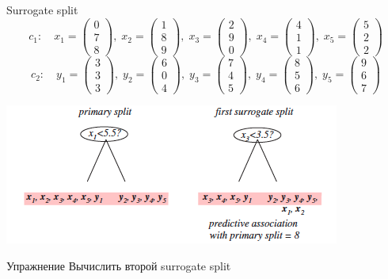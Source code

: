 \documentclass[aspectratio=169]{beamer}
\begin{document}
\begin{frame}{Surrogate split}
\vspace{-1em}
\[
c_1: \quad 
x_1=\begin{pmatrix}0 \\ 7 \\ 8\end{pmatrix},\;
x_2=\begin{pmatrix}1 \\ 8 \\ 9\end{pmatrix},\;
x_3=\begin{pmatrix}2 \\ 9 \\ 0\end{pmatrix},\;
x_4=\begin{pmatrix}4 \\ 1 \\ 1\end{pmatrix},\;
x_5=\begin{pmatrix}5 \\ 2 \\ 2\end{pmatrix}
\]
\[
c_2: \quad 
y_1=\begin{pmatrix}3 \\ 3 \\ 3\end{pmatrix},\;
y_2=\begin{pmatrix}6 \\ 0 \\ 4\end{pmatrix},\;
y_3=\begin{pmatrix}7 \\ 4 \\ 5\end{pmatrix},\;
y_4=\begin{pmatrix}8 \\ 5 \\ 6\end{pmatrix},\;
y_5=\begin{pmatrix}9 \\ 6 \\ 7\end{pmatrix}
\]
\begin{center}
\includegraphics[scale=0.5]{images/surrogate2.png}
\end{center}

\begin{exampleblock}{Упражнение}
Вычислить второй surrogate split
\end{exampleblock}

\end{frame}
\end{document}
